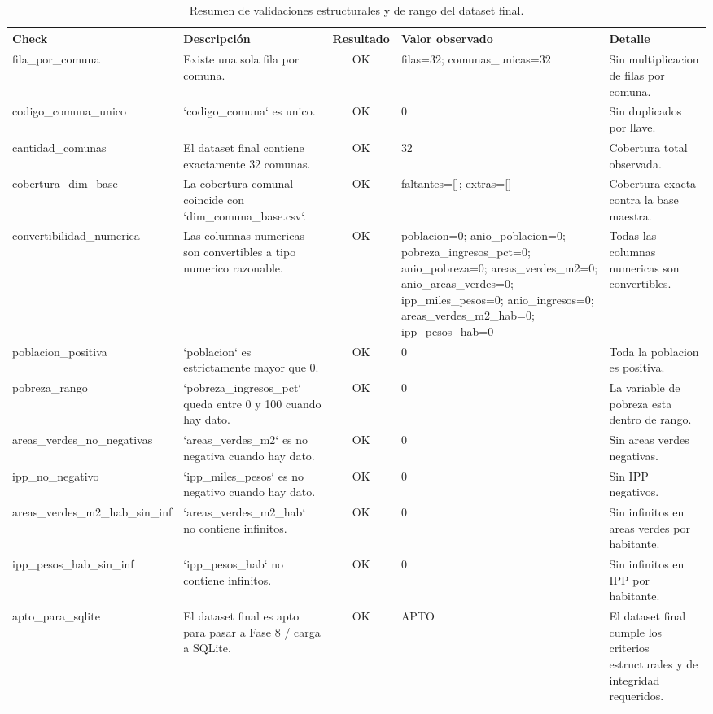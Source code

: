 \begin{table}[htbp]
\centering
\scriptsize
\caption{Resumen de validaciones estructurales y de rango del dataset final.}
\begin{tabular}{|p{2.4cm}|p{5.0cm}|c|p{3.2cm}|p{3.4cm}|}
\hline
Check & Descripción & Resultado & Valor observado & Detalle \\
\hline
fila\_por\_comuna & Existe una sola fila por comuna. & OK & filas=32; comunas\_unicas=32 & Sin multiplicacion de filas por comuna. \\
codigo\_comuna\_unico & `codigo\_comuna` es unico. & OK & 0 & Sin duplicados por llave. \\
cantidad\_comunas & El dataset final contiene exactamente 32 comunas. & OK & 32 & Cobertura total observada. \\
cobertura\_dim\_base & La cobertura comunal coincide con `dim\_comuna\_base.csv`. & OK & faltantes=[]; extras=[] & Cobertura exacta contra la base maestra. \\
convertibilidad\_numerica & Las columnas numericas son convertibles a tipo numerico razonable. & OK & poblacion=0; anio\_poblacion=0; pobreza\_ingresos\_pct=0; anio\_pobreza=0; areas\_verdes\_m2=0; anio\_areas\_verdes=0; ipp\_miles\_pesos=0; anio\_ingresos=0; areas\_verdes\_m2\_hab=0; ipp\_pesos\_hab=0 & Todas las columnas numericas son convertibles. \\
poblacion\_positiva & `poblacion` es estrictamente mayor que 0. & OK & 0 & Toda la poblacion es positiva. \\
pobreza\_rango & `pobreza\_ingresos\_pct` queda entre 0 y 100 cuando hay dato. & OK & 0 & La variable de pobreza esta dentro de rango. \\
areas\_verdes\_no\_negativas & `areas\_verdes\_m2` es no negativa cuando hay dato. & OK & 0 & Sin areas verdes negativas. \\
ipp\_no\_negativo & `ipp\_miles\_pesos` es no negativo cuando hay dato. & OK & 0 & Sin IPP negativos. \\
areas\_verdes\_m2\_hab\_sin\_inf & `areas\_verdes\_m2\_hab` no contiene infinitos. & OK & 0 & Sin infinitos en areas verdes por habitante. \\
ipp\_pesos\_hab\_sin\_inf & `ipp\_pesos\_hab` no contiene infinitos. & OK & 0 & Sin infinitos en IPP por habitante. \\
apto\_para\_sqlite & El dataset final es apto para pasar a Fase 8 / carga a SQLite. & OK & APTO & El dataset final cumple los criterios estructurales y de integridad requeridos. \\
\hline
\end{tabular}
\end{table}
